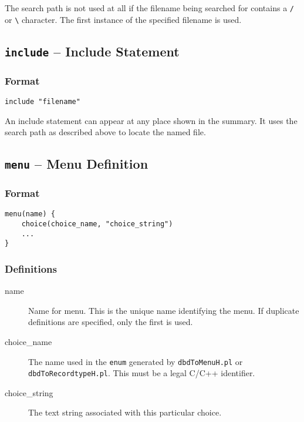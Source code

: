 The search path is not used at all if the filename being searched for contains a \verb|/| or \verb|\| character.
The first instance of the specified filename is used.

\subsection{\texttt{include} -- Include Statement}

\subsubsection{Format}

\begin{verbatim}
include "filename"
\end{verbatim}

An include statement can appear at any place shown in the summary.
It uses the search path as described above to locate the named file.

\subsection{\texttt{menu} -- Menu Definition}

\subsubsection{Format}

\begin{verbatim}
menu(name) {
    choice(choice_name, "choice_string")
    ...
}
\end{verbatim}

\subsubsection{Definitions}

\begin{description}
\item [name] Name for menu. This is the unique name identifying the menu.
If duplicate definitions are specified, only the first is used.

\item [choice\_name] The name used in the \verb|enum| generated by \verb|dbdToMenuH.pl| or \verb|dbdToRecordtypeH.pl|.
This must be a legal C/C++ identifier.

\item [choice\_string] The text string associated with this particular choice.
\end{description}

